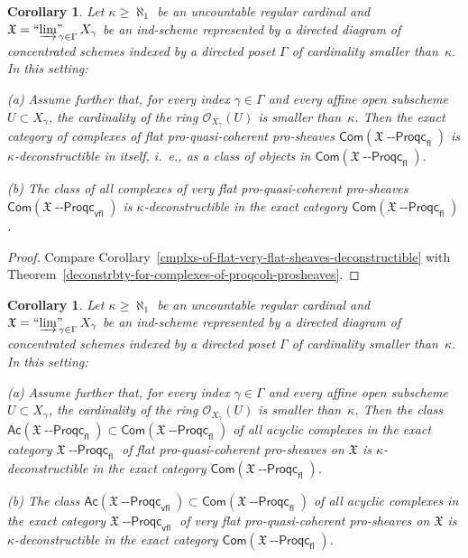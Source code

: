 \documentclass[12pt,a4paper]{amsart}
\newcommand{\+}{\protect\nobreakdash-}
\renewcommand{\:}{\colon}
\newcommand{\Proqc}{{\operatorname{\mathsf{--Proqc}}}}
\newcommand{\fl}{\mathsf{fl}}
\newcommand{\vfl}{\mathsf{vfl}}
\newcommand{\Com}{\mathsf{Com}}
\newcommand{\Ac}{\mathsf{Ac}}
\newcommand{\ilim}
 {\mathop{\text{\normalfont``$\varinjlim$''\!\!}}\nolimits}
\newcommand{\cO}{\mathcal O}
\newcommand{\fX}{\mathfrak X}
\theoremstyle{plain}
\newtheorem{cor}[thm]{Corollary}
\theoremstyle{definition}
\begin{document}
\begin{cor} \label{complexes-of-flat-vfl-proqcoh-prosh-deconstrble}
 Let\/ $\kappa\ge\aleph_1$ be an uncountable regular cardinal and\/
$\fX=\ilim_{\gamma\in\Gamma}X_\gamma$ be an ind-scheme represented
by a directed diagram of concentrated schemes indexed by a directed
poset\/ $\Gamma$ of cardinality smaller than\/~$\kappa$.
 In this setting: \par
\textup{(a)} Assume further that, for every index\/ $\gamma\in\Gamma$
and every affine open subscheme $U\subset X_\gamma$, the cardinality
of the ring\/ $\cO_{X_\gamma}(U)$ is smaller than\/~$\kappa$.
 Then the exact category of complexes of flat pro-quasi-coherent
pro-sheaves\/ $\Com(\fX\Proqc_\fl)$ is\/ $\kappa$\+deconstructible in
itself, i.~e., as a class of objects in\/ $\Com(\fX\Proqc_\fl)$. \par
\textup{(b)} The class of all complexes of very flat pro-quasi-coherent
pro-sheaves\/ $\Com(\fX\Proqc_\vfl)$ is\/
$\kappa$\+deconstructible in the exact category\/
$\Com(\fX\Proqc_\fl)$.  
\end{cor}

\begin{proof}
 Compare
Corollary~\ref{cmplxs-of-flat-very-flat-sheaves-deconstructible}
with Theorem~\ref{deconstrbty-for-complexes-of-proqcoh-prosheaves}.
\end{proof}

\begin{cor} \label{acycl-cmplxs-of-flat-vfl-proqcoh-prosh-deconstrble}
 Let\/ $\kappa\ge\aleph_1$ be an uncountable regular cardinal and\/
$\fX=\ilim_{\gamma\in\Gamma}X_\gamma$ be an ind-scheme represented
by a directed diagram of concentrated schemes indexed by a directed
poset\/ $\Gamma$ of cardinality smaller than\/~$\kappa$.
 In this setting: \par
\textup{(a)} Assume further that, for every index\/ $\gamma\in\Gamma$
and every affine open subscheme $U\subset X_\gamma$, the cardinality
of the ring\/ $\cO_{X_\gamma}(U)$ is smaller than\/~$\kappa$.
 Then the class\/ $\Ac(\fX\Proqc_\fl)\subset\Com(\fX\Proqc_\fl)$ of all
acyclic complexes in the exact category\/ $\fX\Proqc_\fl$ of flat
pro-quasi-coherent pro-sheaves on\/ $\fX$ is\/ $\kappa$\+deconstructible
in the exact category\/ $\Com(\fX\Proqc_\fl)$. \par
\textup{(b)} The class\/ $\Ac(\fX\Proqc_\vfl)\subset\Com(\fX\Proqc_\fl)$
of all acyclic complexes in the exact category\/ $\fX\Proqc_\vfl$ of
very flat pro-quasi-coherent pro-sheaves on\/ $\fX$ is\/
$\kappa$\+deconstructible in the exact category\/ $\Com(\fX\Proqc_\fl)$.
\end{cor}
\end{document}
